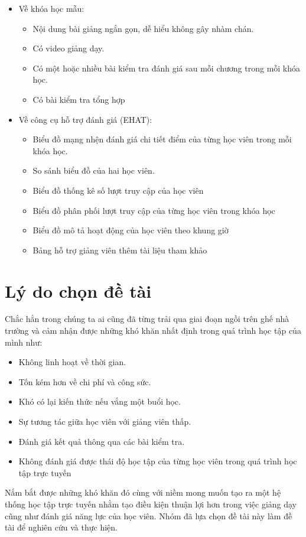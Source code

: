 \begin{itemize}
	\item Về khóa học mẫu:
	\begin{itemize}
		\item Nội dung bài giảng ngắn gọn, dễ hiểu không gây nhàm chán.
		\item Có video giảng dạy.
		\item Có một hoặc nhiều bài kiểm tra đánh giá sau mỗi chương trong mỗi khóa học.
		\item Có bài kiểm tra tổng hợp
	\end{itemize}
	\item Về công cụ hỗ trợ đánh giá (EHAT):
	\begin{itemize}
		\item Biểu đồ mạng nhện đánh giá chi tiết điểm của từng học viên trong mỗi khóa học.
		\item So sánh biểu đồ của hai học viên.
		\item Biểu đồ thống kê số lượt truy cập của học viên
		\item Biểu đồ phân phối lượt truy cập của từng học viên trong khóa học
		\item Biểu đồ mô tả hoạt động của học viên theo khung giờ
		\item Bảng hỗ trợ giảng viên thêm tài liệu tham khảo
	\end{itemize}
\end{itemize}

\section{Lý do chọn đề tài}
Chắc hẳn trong chúng ta ai cũng đã từng trải qua giai đoạn ngồi trên ghế nhà trường và cảm nhận được những khó khăn nhất định trong quá trình học tập của mình như:
\begin{itemize}
	\item Không linh hoạt về thời gian.
	\item Tốn kém hơn về chi phí và công sức.
	\item Khó có lại kiến thức nếu vắng một buổi học.
	\item Sự tương tác giữa học viên với giảng viên thấp.
	\item Đánh giá kết quả thông qua các bài kiểm tra.
	\item Không đánh giá được thái độ học tập của từng học viên trong quá trình học tập trực tuyến
\end{itemize}
Nắm bắt được những khó khăn đó cùng với niềm mong muốn tạo ra một hệ thống học tập trực tuyến nhằm tạo điều kiện thuận lợi hơn trong việc giảng dạy cũng như đánh giá năng lực của học viên. Nhóm đã lựa chọn đề tài này làm đề tài để nghiên cứu và thực hiện.

